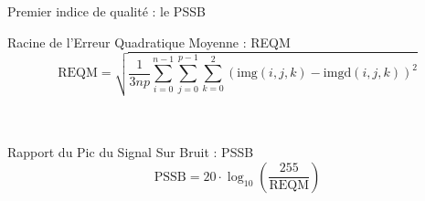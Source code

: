 \documentclass[xcolor=dvipsnames]{beamer}
\begin{document}

\begin{frame} {Premier indice de qualité : le PSSB}
    \centering
    \scriptsize

    
    Racine de l'Erreur Quadratique Moyenne : REQM
    \[
    \text{REQM} = \sqrt{\frac{1}{3np} \sum_{i=0}^{n-1} \sum_{j=0}^{p-1} \sum_{k=0}^{2} \left( \text{img}(i, j, k) - \text{imgd}(i, j, k) \right)^2}
    \]

    \centering
    \scriptsize
    \ \\ \ \\  Rapport du Pic du Signal Sur Bruit : PSSB
    \[
    \text{PSSB} = 20 \cdot \log_{10} \left( \frac{255}{\text{REQM}} \right)
    \]

\end{frame}
\end{document}
